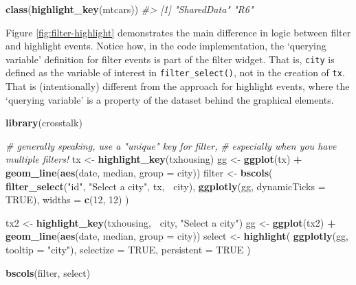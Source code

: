 \documentclass[
  12pt,
]{krantz}
\newenvironment{Shaded}{\begin{snugshade}}{\end{snugshade}}
\newcommand{\CommentTok}[1]{\textcolor[rgb]{0.56,0.35,0.01}{\textit{#1}}}
\newcommand{\DataTypeTok}[1]{\textcolor[rgb]{0.13,0.29,0.53}{#1}}
\newcommand{\DecValTok}[1]{\textcolor[rgb]{0.00,0.00,0.81}{#1}}
\newcommand{\KeywordTok}[1]{\textcolor[rgb]{0.13,0.29,0.53}{\textbf{#1}}}
\newcommand{\NormalTok}[1]{#1}
\newcommand{\OperatorTok}[1]{\textcolor[rgb]{0.81,0.36,0.00}{\textbf{#1}}}
\newcommand{\OtherTok}[1]{\textcolor[rgb]{0.56,0.35,0.01}{#1}}
\newcommand{\StringTok}[1]{\textcolor[rgb]{0.31,0.60,0.02}{#1}}
\begin{document}
\begin{Shaded}
\begin{Highlighting}[]
\KeywordTok{class}\NormalTok{(}\KeywordTok{highlight_key}\NormalTok{(mtcars))}
\CommentTok{#> [1] "SharedData" "R6"}
\end{Highlighting}
\end{Shaded}

Figure \ref{fig:filter-highlight} demonstrates the main difference in logic between filter and highlight events. Notice how, in the code implementation, the `querying variable' definition for filter events is part of the filter widget. That is, \texttt{city} is defined as the variable of interest in \texttt{filter\_select()}, not in the creation of \texttt{tx}. That is (intentionally) different from the approach for highlight events, where the `querying variable' is a property of the dataset behind the graphical elements.


\begin{Shaded}
\begin{Highlighting}[]
\KeywordTok{library}\NormalTok{(crosstalk)}

\CommentTok{# generally speaking, use a "unique" key for filter, }
\CommentTok{# especially when you have multiple filters!}
\NormalTok{tx <-}\StringTok{ }\KeywordTok{highlight_key}\NormalTok{(txhousing)}
\NormalTok{gg <-}\StringTok{ }\KeywordTok{ggplot}\NormalTok{(tx) }\OperatorTok{+}\StringTok{ }\KeywordTok{geom_line}\NormalTok{(}\KeywordTok{aes}\NormalTok{(date, median, }\DataTypeTok{group =}\NormalTok{ city))}
\NormalTok{filter <-}\StringTok{ }\KeywordTok{bscols}\NormalTok{(}
  \KeywordTok{filter_select}\NormalTok{(}\StringTok{"id"}\NormalTok{, }\StringTok{"Select a city"}\NormalTok{, tx, }\OperatorTok{~}\NormalTok{city),}
  \KeywordTok{ggplotly}\NormalTok{(gg, }\DataTypeTok{dynamicTicks =} \OtherTok{TRUE}\NormalTok{),}
  \DataTypeTok{widths =} \KeywordTok{c}\NormalTok{(}\DecValTok{12}\NormalTok{, }\DecValTok{12}\NormalTok{)}
\NormalTok{)}

\NormalTok{tx2 <-}\StringTok{ }\KeywordTok{highlight_key}\NormalTok{(txhousing, }\OperatorTok{~}\NormalTok{city, }\StringTok{"Select a city"}\NormalTok{)}
\NormalTok{gg <-}\StringTok{ }\KeywordTok{ggplot}\NormalTok{(tx2) }\OperatorTok{+}\StringTok{ }\KeywordTok{geom_line}\NormalTok{(}\KeywordTok{aes}\NormalTok{(date, median, }\DataTypeTok{group =}\NormalTok{ city))}
\NormalTok{select <-}\StringTok{ }\KeywordTok{highlight}\NormalTok{(}
  \KeywordTok{ggplotly}\NormalTok{(gg, }\DataTypeTok{tooltip =} \StringTok{"city"}\NormalTok{), }
  \DataTypeTok{selectize =} \OtherTok{TRUE}\NormalTok{, }\DataTypeTok{persistent =} \OtherTok{TRUE}
\NormalTok{)}

\KeywordTok{bscols}\NormalTok{(filter, select)}
\end{Highlighting}
\end{Shaded}
\end{document}
